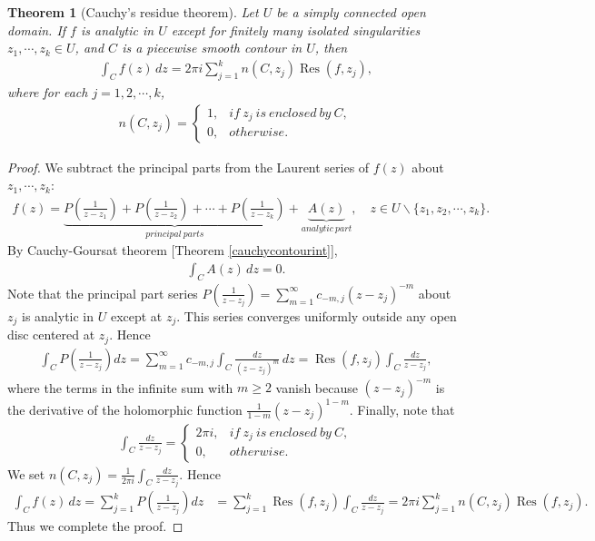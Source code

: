 \documentclass{article}
\numberwithin{equation}{section}
\DeclareMathOperator{\res}{Res}
\theoremstyle{plain}
\newtheorem{theorem}{Theorem}[section]
\theoremstyle{definition}
\begin{document}
\begin{theorem}[Cauchy's residue theorem]
Let $U$ be a simply connected open domain. If $f$ is analytic in $U$ except for finitely many isolated singularities $z_1,\cdots,z_k\in U$, and $C$ is a piecewise smooth contour in $U$, then
\begin{align}
	\int_C f(z)\,dz=2\pi i\sum_{j=1}^k n(C,z_j)\res(f,z_j),
\end{align}
where for each $j=1,2,\cdots,k$,
\begin{align*}
	n(C,z_j)=\begin{cases}
		1, &if\ z_j\ is\ enclosed\ by\ C,\\
		0, &otherwise.
	\end{cases}
\end{align*}
\end{theorem}
\begin{proof}
We subtract the principal parts from the Laurent series of $f(z)$ about $z_1,\cdots,z_k$:
\begin{align*}
	f(z)=\underbrace{P\left(\frac{1}{z-z_1}\right)+P\left(\frac{1}{z-z_2}\right)+\cdots+P\left(\frac{1}{z-z_k}\right)}_{principal\ parts}+\underbrace{A(z)}_{analytic\ part},\quad z\in U\backslash\{z_1,z_2,\cdots,z_k\}.
\end{align*}
By Cauchy-Goursat theorem [Theorem \ref{cauchycontourint}], 
\begin{align*}
	\int_C A(z)\,dz=0.
\end{align*}
Note that the principal part series $P\left(\frac{1}{z-z_j}\right)=\sum_{m=1}^\infty c_{-m,j}(z-z_j)^{-m}$ about $z_j$ is analytic in $U$ except at $z_j$. This series converges uniformly outside any open disc centered at $z_j$. Hence
\begin{align*}
\int_C P\left(\frac{1}{z-z_j}\right)dz=\sum_{m=1}^\infty c_{-m,j}\int_C\frac{dz}{(z-z_j)^m}\,dz=\res(f,z_j)\int_C\frac{dz}{z-z_j},
\end{align*}
where the terms in the infinite sum with $m\geq 2$ vanish because $(z-z_j)^{-m}$ is the derivative of the holomorphic function $\frac{1}{1-m}(z-z_j)^{1-m}$. Finally, note that
\begin{align*}
	\int_C\frac{dz}{z-z_j} = \begin{cases}
		2\pi i, &if\ z_j\ is\ enclosed\ by\ C,\\
		0, &otherwise.
	\end{cases}
\end{align*}
We set $n(C,z_j)=\frac{1}{2\pi i}\int_C\frac{dz}{z-z_j}$. Hence
\begin{align*}
	\int_C f(z)\,dz=\sum_{j=1}^kP\left(\frac{1}{z-z_j}\right)dz&=\sum_{j=1}^k\res(f,z_j)\int_C\frac{dz}{z-z_j}=2\pi i\sum_{j=1}^k n(C,z_j)\res(f,z_j).
\end{align*}
Thus we complete the proof.
\end{proof}
\end{document}

